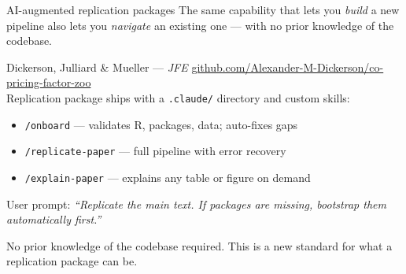 \documentclass[aspectratio=169, 10pt]{beamer}
\begin{document}
\begin{frame}{AI-augmented replication packages}
  The same capability that lets you \textit{build} a new pipeline also lets
  you \textit{navigate} an existing one --- with no prior knowledge of the
  codebase.

  \vspace{0.5em}
  \begin{block}{Dickerson, Julliard \& Mueller --- \textit{JFE}}
    \small
    \href{https://github.com/Alexander-M-Dickerson/co-pricing-factor-zoo}{github.com/Alexander-M-Dickerson/co-pricing-factor-zoo}\\[0.3em]
    Replication package ships with a \texttt{.claude/} directory and custom skills:
    \begin{itemize}
      \item \texttt{/onboard} --- validates R, packages, data; auto-fixes gaps
      \item \texttt{/replicate-paper} --- full pipeline with error recovery
      \item \texttt{/explain-paper} --- explains any table or figure on demand
    \end{itemize}
    \vspace{0.2em}
    User prompt: \textit{``Replicate the main text. If packages are missing,
    bootstrap them automatically first.''}
  \end{block}

  \vspace{0.2em}
  \begin{findingbox}
    No prior knowledge of the codebase required.
    This is a new standard for what a replication package can be.
  \end{findingbox}
\end{frame}
\end{document}
